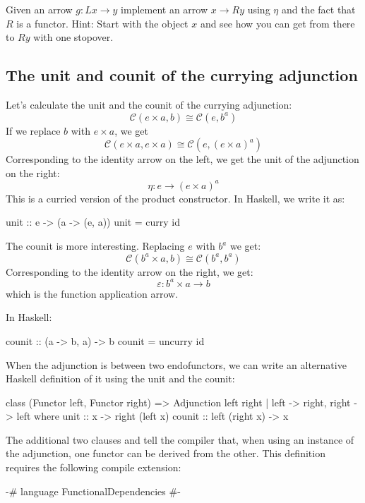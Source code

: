 \documentclass[DaoFP]{subfiles}
\begin{document}
\begin{exercise}
Given an arrow $g \colon L x \to y$ implement an arrow $x \to R y$ using $\eta$ and the fact that $R$ is a functor. Hint: Start with the object $x$ and see how you can get from there to $R y$ with one stopover.
\end{exercise}

\subsection{The unit and counit of the currying adjunction}

Let's calculate the unit and the counit of the currying adjunction:
\[  \mathcal{C}(e \times a, b ) \cong  \mathcal{C} (e, b^a)  \]
If we replace $b$ with $e \times a$, we get
\[  \mathcal{C}(e \times a, e \times a ) \cong  \mathcal{C} (e, (e \times a)^a)  \]
Corresponding to the identity arrow on the left, we get the unit of the adjunction on the right:
\[ \eta \colon e \to (e \times a)^a \]
This is a curried version of the product constructor. In Haskell, we write it as:
\begin{haskell}
unit :: e -> (a -> (e, a))
unit = curry id
\end{haskell}

The counit is more interesting. Replacing $e$ with $b^a$ we get:
\[  \mathcal{C}(b^a \times a, b ) \cong  \mathcal{C} (b^a, b^a)  \]
Corresponding to the identity arrow on the right, we get:
\[ \varepsilon \colon b^a \times a \to b \]
which is the function application arrow. 

In Haskell:
\begin{haskell}
counit :: (a -> b, a) -> b
counit = uncurry id
\end{haskell}

When the adjunction is between two endofunctors, we can write an alternative Haskell definition of it using the unit and the counit:
\begin{haskell}
class (Functor left, Functor right) => 
  Adjunction left right | left -> right, right -> left where
    unit   :: x -> right (left x)
    counit :: left (right x) -> x
\end{haskell}
The additional two clauses  and  tell the compiler that, when using an instance of the adjunction, one functor can be derived from the other. This definition requires the following compile extension:
\begin{haskell}
{-# language FunctionalDependencies #-}
\end{haskell}
\end{document}
